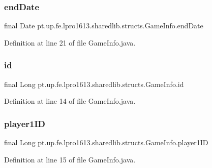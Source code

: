 \subsubsection{\texorpdfstring{end\+Date}{endDate}}
{\footnotesize\ttfamily final Date pt.\+up.\+fe.\+lpro1613.\+sharedlib.\+structs.\+Game\+Info.\+end\+Date}



Definition at line 21 of file Game\+Info.\+java.

\hypertarget{classpt_1_1up_1_1fe_1_1lpro1613_1_1sharedlib_1_1structs_1_1_game_info_adb09167b90f2eec153dcbaa446ff339d}{}\label{classpt_1_1up_1_1fe_1_1lpro1613_1_1sharedlib_1_1structs_1_1_game_info_adb09167b90f2eec153dcbaa446ff339d} 
\subsubsection{\texorpdfstring{id}{id}}
{\footnotesize\ttfamily final Long pt.\+up.\+fe.\+lpro1613.\+sharedlib.\+structs.\+Game\+Info.\+id}



Definition at line 14 of file Game\+Info.\+java.

\hypertarget{classpt_1_1up_1_1fe_1_1lpro1613_1_1sharedlib_1_1structs_1_1_game_info_aef64a242737d860c02cc062c6f7ce737}{}\label{classpt_1_1up_1_1fe_1_1lpro1613_1_1sharedlib_1_1structs_1_1_game_info_aef64a242737d860c02cc062c6f7ce737} 
\subsubsection{\texorpdfstring{player1\+ID}{player1ID}}
{\footnotesize\ttfamily final Long pt.\+up.\+fe.\+lpro1613.\+sharedlib.\+structs.\+Game\+Info.\+player1\+ID}



Definition at line 15 of file Game\+Info.\+java.

\hypertarget{classpt_1_1up_1_1fe_1_1lpro1613_1_1sharedlib_1_1structs_1_1_game_info_abedaccd1dc1cd6598ef34a42f9a8241f}{}\label{classpt_1_1up_1_1fe_1_1lpro1613_1_1sharedlib_1_1structs_1_1_game_info_abedaccd1dc1cd6598ef34a42f9a8241f} 
